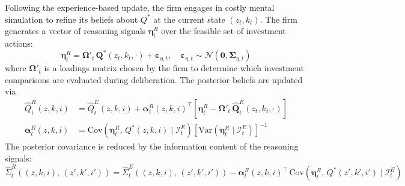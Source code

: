 \begin{definition} \label{def:reasoning_learning_update}
    Following the experience-based update, the firm engages in costly mental 
    simulation to refine its beliefs about $Q^*$ at the current state 
    $(z_t, k_t)$. The firm generates a vector of reasoning signals 
    $\boldsymbol{\eta}^R_t$ over the feasible set of investment actions:
    \begin{equation}
        \boldsymbol{\eta}^R_t = \boldsymbol{\Omega}'_t\, 
        \boldsymbol{Q}^*(z_t, k_t, \cdot) + \boldsymbol{\varepsilon}_{\eta,t}, 
        \quad \boldsymbol{\varepsilon}_{\eta,t} \sim 
        \mathcal{N}(\boldsymbol{0}, \boldsymbol{\Sigma}_{\eta,t})
    \end{equation}
    where $\boldsymbol{\Omega}'_t$ is a loadings matrix chosen by the firm to 
    determine which investment comparisons are evaluated during deliberation. 
    The posterior beliefs are updated via
    \begin{align}
        \hat{Q}^R_t(z,k,i) &= \hat{Q}^E_t(z,k,i) 
        + \boldsymbol{\alpha}^R_t(z,k,i)^\top 
        \left[\boldsymbol{\eta}^R_t - \boldsymbol{\Omega}'_t\, 
        \hat{\boldsymbol{Q}}^E_t(z_t, k_t, \cdot)\right] \\
        \boldsymbol{\alpha}^R_t(z,k,i) &= 
        \mathrm{Cov}\!\left(\boldsymbol{\eta}^R_t,\, Q^*(z,k,i) 
        \mid \mathcal{I}^E_t\right) 
        \left[\mathrm{Var}\!\left(\boldsymbol{\eta}^R_t 
        \mid \mathcal{I}^E_t\right)\right]^{-1}
    \end{align}
    The posterior covariance is reduced by the information content of the 
    reasoning signals:
    \begin{equation}
        \hat{\Sigma}^R_t\!\left((z,k,i),\,(z',k',i')\right) = 
        \hat{\Sigma}^E_t\!\left((z,k,i),\,(z',k',i')\right) 
        - \boldsymbol{\alpha}^R_t(z,k,i)^\top\, 
        \mathrm{Cov}\!\left(\boldsymbol{\eta}^R_t,\, Q^*(z',k',i') 
        \mid \mathcal{I}^E_t\right)
    \end{equation}
\end{definition}

\newpage

